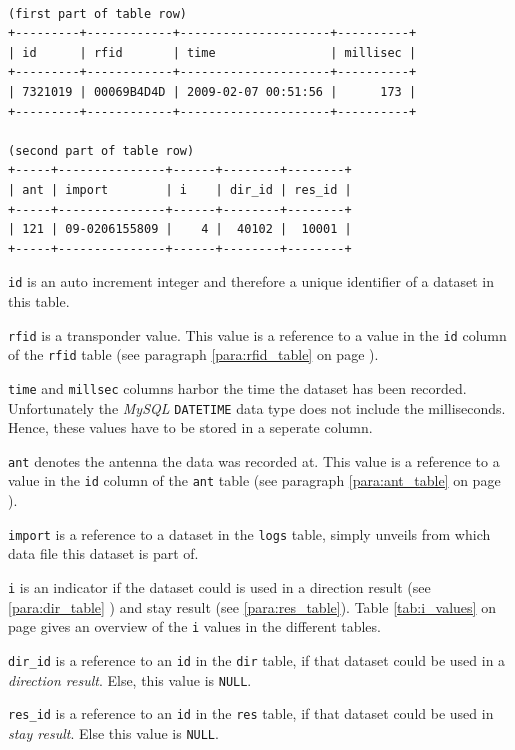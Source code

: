 \codescript
\begin{lstlisting}[frame=none]

(first part of table row)
+---------+------------+---------------------+----------+
| id      | rfid       | time                | millisec |
+---------+------------+---------------------+----------+
| 7321019 | 00069B4D4D | 2009-02-07 00:51:56 |      173 |
+---------+------------+---------------------+----------+

(second part of table row)
+-----+---------------+------+--------+--------+
| ant | import        | i    | dir_id | res_id |
+-----+---------------+------+--------+--------+
| 121 | 09-0206155809 |    4 |  40102 |  10001 |
+-----+---------------+------+--------+--------+

\end{lstlisting}

\begin{mydesc}
  \item \lstinline|id| is an auto increment integer and therefore a unique identifier of a dataset in this table.
  \item \lstinline|rfid| is a transponder value. This value is a reference to a value in the \lstinline|id| column of the \lstinline|rfid| table (see paragraph \ref{para:rfid_table} on page \pageref{para:rfid_table}).
  \item \lstinline|time| and \lstinline|millsec| columns harbor the time the dataset has been recorded. Unfortunately the \textit{MySQL} \lstinline|DATETIME| data type does not include the milliseconds. Hence, these values have to be stored in a seperate column.
  \item \lstinline|ant| denotes the antenna the data was recorded at. This value is a reference to a value in the \lstinline|id| column of the \lstinline|ant| table (see paragraph \ref{para:ant_table} on page \pageref{para:ant_table}).
  \item \lstinline|import| is a reference to a dataset in the \lstinline|logs| table, simply unveils from which data file this dataset is part of.
  \item \lstinline|i| is an indicator if the dataset could is used in a direction result (see \ref{para:dir_table} ) and stay result (see \ref{para:res_table}). Table \ref{tab:i_values} on page \pageref{tab:i_values} gives an overview of the \lstinline|i| values in the different tables.
  \item \lstinline|dir_id| is a reference to an \lstinline|id| in the \lstinline|dir| table, if that dataset could be used in a \textit{direction result}. Else, this value is \lstinline|NULL|.
  \item \lstinline|res_id| is a reference to an \lstinline|id| in the \lstinline|res| table, if that dataset could be used in \textit{stay result}. Else this value is \lstinline|NULL|.
\end{mydesc}

